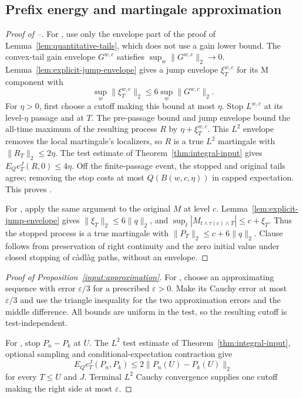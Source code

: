\subsection{Prefix energy and martingale approximation}
\label{sec:approximation-inputs}
\begin{proof}[Proof of --]
For , use only the envelope part of the proof of Lemma~\ref{lem:quantitative-tails},
which does not use a gain lower bound. The convex-tail gain envelope $G^{w,c}$ satisfies
$\sup_w\|G^{w,c}\|_2\to0$. Lemma~\ref{lem:explicit-jump-envelope} gives a jump envelope
$\xi_T^{w,c}$ for its M component with
\[\sup_w\|\xi_T^{w,c}\|_2\leq6\sup_w\|G^{w,c}\|_2.\]
For $\eta>0$, first choose a cutoff making this bound at most $\eta$.
Stop $L^{w,c}$ at its level-$\eta$ passage and at $T$.
The pre-passage bound and jump envelope bound the all-time maximum of the resulting process $R$ by $\eta+\xi_T^{w,c}$.
This $L^2$ envelope removes the local martingale's localizers, so $R$ is a true $L^2$ martingale with $\|R_T\|_2\leq2\eta$.
The test estimate of Theorem~\ref{thm:integral-input} gives $E_Qe_T^J(R,0)\leq4\eta$.
Off the finite-passage event, the stopped and original tails agree; removing the stop costs at most $Q(B(w,c,\eta))$ in capped expectation.
This proves .

For , apply the same argument to the original $M$ at level $c$.
Lemma~\ref{lem:explicit-jump-envelope} gives $\|\xi_T\|_2\leq6\|q\|_2$, and
$\sup_t|M_{t\wedge\tau(c)\wedge T}|\leq c+\xi_T$.
Thus the stopped process is a true martingale with $\|P_T\|_2\leq c+6\|q\|_2$.
Clause  follows from preservation of right continuity and the zero initial value under closed stopping of c\`adl\`ag paths, without an envelope.
\end{proof}

\begin{proof}[Proof of Proposition~\ref{input:approximation}]
For , choose an approximating sequence with error $\varepsilon/3$ for a prescribed $\varepsilon>0$.
Make its Cauchy error at most $\varepsilon/3$ and use the triangle inequality for the two approximation errors and the middle difference.
All bounds are uniform in the test, so the resulting cutoff is test-independent.

For , stop $P_n-P_k$ at $U$.
The $L^2$ test estimate of Theorem~\ref{thm:integral-input}, optional sampling and conditional-expectation contraction give
\[
 E_Qe_T^J(P_n,P_k)\leq2\|P_n(U)-P_k(U)\|_2
\]
for every $T\leq U$ and $J$.
Terminal $L^2$ Cauchy convergence supplies one cutoff making the right side at most $\varepsilon$.
\end{proof}
